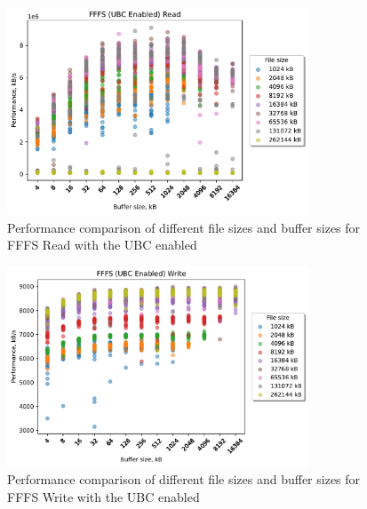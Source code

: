 \begin{figure}[!htb]
	\label{fig:bench_fffs_ubc_scatter_read}
	\begin{center}
		\includegraphics[width=0.8\textwidth]{figures.nosync/benchmarking/FFFS/scatter-UBC Enabled-Read.pdf}
	\end{center}
	\caption[Comparison of Read performance for file size and buffer size for FFFS with the UBC enabled]{Performance comparison of different file sizes and buffer sizes for FFFS Read with the UBC enabled}
\end{figure}
\begin{figure}[!htb]
	\label{fig:bench_fffs_ubc_scatter_write}
	\begin{center}
		\includegraphics[width=0.8\textwidth]{figures.nosync/benchmarking/FFFS/scatter-UBC Enabled-Write.pdf}
	\end{center}
	\caption[Comparison of Write performance for file size and buffer size for FFFS with the UBC enabled]{Performance comparison of different file sizes and buffer sizes for FFFS Write with the UBC enabled}
\end{figure}
\clearpage
